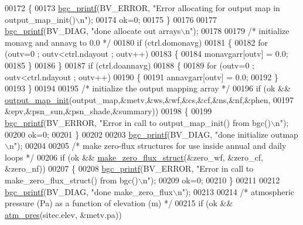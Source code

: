 \begin{DoxyCode}
00172     \{
00173         \hyperlink{bgc__io_8c_af287cce6e2aede1ce337de9319e80d0d}{bgc\_printf}(BV\_ERROR, \textcolor{stringliteral}{"Error allocating for output map in output\_map\_init()\(\backslash\)n"});
00174         ok=0;
00175     \}
00176     
00177     \hyperlink{bgc__io_8c_af287cce6e2aede1ce337de9319e80d0d}{bgc\_printf}(BV\_DIAG, \textcolor{stringliteral}{"done allocate out arrays\(\backslash\)n"});
00178     
00179     \textcolor{comment}{/* initialize monavg and annavg to 0.0 */}
00180     \textcolor{keywordflow}{if} (ctrl.domonavg)
00181     \{
00182         \textcolor{keywordflow}{for} (outv=0 ; outv<ctrl.ndayout ; outv++)
00183         \{
00184             monavgarr[outv] = 0.0;
00185         \}
00186     \}
00187     \textcolor{keywordflow}{if} (ctrl.doannavg)
00188     \{
00189         \textcolor{keywordflow}{for} (outv=0 ; outv<ctrl.ndayout ; outv++)
00190         \{
00191             annavgarr[outv] = 0.0;
00192         \}
00193     \}
00194 
00195     \textcolor{comment}{/* initialize the output mapping array */}
00196     \textcolor{keywordflow}{if} (ok && \hyperlink{output__map__init_8c_aecdfe7c08babe362b34e23a5488eae09}{output\_map\_init}(output\_map,&metv,&ws,&wf,&cs,&cf,&ns,&nf,&phen,
00197         &epv,&psn\_sun,&psn\_shade,&summary))
00198     \{
00199         \hyperlink{bgc__io_8c_af287cce6e2aede1ce337de9319e80d0d}{bgc\_printf}(BV\_ERROR, \textcolor{stringliteral}{"Error in call to output\_map\_init() from bgc()\(\backslash\)n"});
00200         ok=0;
00201     \}
00202     
00203     \hyperlink{bgc__io_8c_af287cce6e2aede1ce337de9319e80d0d}{bgc\_printf}(BV\_DIAG, \textcolor{stringliteral}{"done initialize outmap\(\backslash\)n"});
00204     
00205     \textcolor{comment}{/* make zero-flux structures for use inside annual and daily loops */}
00206     \textcolor{keywordflow}{if} (ok && \hyperlink{make__zero__flux__struct_8c_a22aa2b538ae817627f4d4eae85cb3993}{make\_zero\_flux\_struct}(&zero\_wf, &zero\_cf, &zero\_nf))
00207     \{
00208         \hyperlink{bgc__io_8c_af287cce6e2aede1ce337de9319e80d0d}{bgc\_printf}(BV\_ERROR, \textcolor{stringliteral}{"Error in call to make\_zero\_flux\_struct() from bgc()\(\backslash\)n"});
00209         ok=0;
00210     \}
00211 
00212     \hyperlink{bgc__io_8c_af287cce6e2aede1ce337de9319e80d0d}{bgc\_printf}(BV\_DIAG, \textcolor{stringliteral}{"done make\_zero\_flux\(\backslash\)n"});
00213     
00214     \textcolor{comment}{/* atmospheric pressure (Pa) as a function of elevation (m) */}
00215     \textcolor{keywordflow}{if} (ok && \hyperlink{atm__pres_8c_a30d2b9ec7344a16b2cd045cfe92995e2}{atm\_pres}(sitec.elev, &metv.pa))

\end{DoxyCode}
